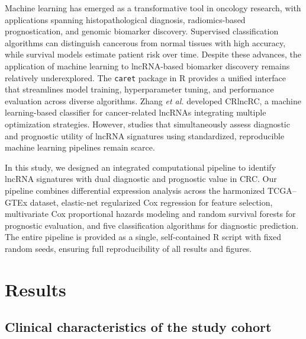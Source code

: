 \documentclass[fleqn,10pt]{wlscirep}
\begin{document}
Machine learning has emerged as a transformative tool in oncology research, with applications spanning histopathological diagnosis, radiomics-based prognostication, and genomic biomarker discovery\cite{RN13}. Supervised classification algorithms can distinguish cancerous from normal tissues with high accuracy, while survival models estimate patient risk over time\cite{RN14,RN15}. Despite these advances, the application of machine learning to lncRNA-based biomarker discovery remains relatively underexplored. The \texttt{caret} package in R provides a unified interface that streamlines model training, hyperparameter tuning, and performance evaluation across diverse algorithms\cite{RN16}. Zhang \textit{et al.} developed CRlncRC, a machine learning-based classifier for cancer-related lncRNAs integrating multiple optimization strategies\cite{RN17}. However, studies that simultaneously assess diagnostic and prognostic utility of lncRNA signatures using standardized, reproducible machine learning pipelines remain scarce\cite{RN18,RN19}.

In this study, we designed an integrated computational pipeline to identify lncRNA signatures with dual diagnostic and prognostic value in CRC. Our pipeline combines differential expression analysis across the harmonized TCGA--GTEx dataset, elastic-net regularized Cox regression for feature selection, multivariate Cox proportional hazards modeling and random survival forests for prognostic evaluation, and five classification algorithms for diagnostic prediction. The entire pipeline is provided as a single, self-contained R script with fixed random seeds, ensuring full reproducibility of all results and figures.

\section*{Results}

\subsection*{Clinical characteristics of the study cohort}
\end{document}
